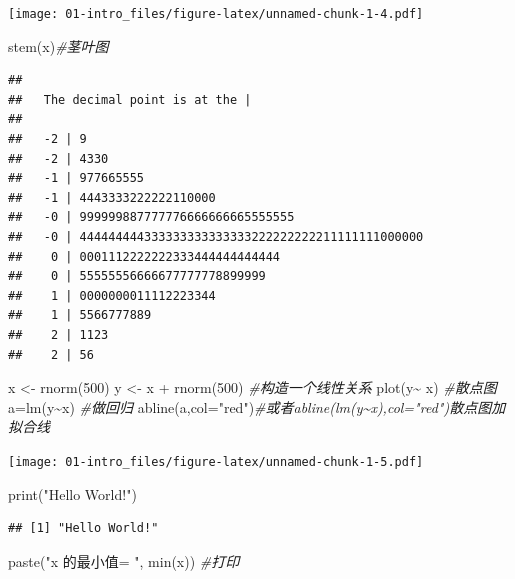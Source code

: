 \documentclass[
]{book}
\newenvironment{Shaded}{\begin{snugshade}}{\end{snugshade}}
\newcommand{\AttributeTok}[1]{\textcolor[rgb]{0.77,0.63,0.00}{#1}}
\newcommand{\CommentTok}[1]{\textcolor[rgb]{0.56,0.35,0.01}{\textit{#1}}}
\newcommand{\DecValTok}[1]{\textcolor[rgb]{0.00,0.00,0.81}{#1}}
\newcommand{\FunctionTok}[1]{\textcolor[rgb]{0.00,0.00,0.00}{#1}}
\newcommand{\NormalTok}[1]{#1}
\newcommand{\OtherTok}[1]{\textcolor[rgb]{0.56,0.35,0.01}{#1}}
\newcommand{\SpecialCharTok}[1]{\textcolor[rgb]{0.00,0.00,0.00}{#1}}
\newcommand{\StringTok}[1]{\textcolor[rgb]{0.31,0.60,0.02}{#1}}
\begin{document}
\texttt{[image: 01-intro\_files/figure-latex/unnamed-chunk-1-4.pdf]}

\begin{Shaded}
\begin{Highlighting}[]
\FunctionTok{stem}\NormalTok{(x)}\CommentTok{\#茎叶图}
\end{Highlighting}
\end{Shaded}

\begin{verbatim}
## 
##   The decimal point is at the |
## 
##   -2 | 9
##   -2 | 4330
##   -1 | 977665555
##   -1 | 4443333222222110000
##   -0 | 999999887777776666666665555555
##   -0 | 444444444333333333333333222222222211111111000000
##    0 | 0001112222222333444444444444
##    0 | 55555556666677777778899999
##    1 | 0000000011112223344
##    1 | 5566777889
##    2 | 1123
##    2 | 56
\end{verbatim}

\begin{Shaded}
\begin{Highlighting}[]
\NormalTok{x }\OtherTok{\textless{}{-}} \FunctionTok{rnorm}\NormalTok{(}\DecValTok{500}\NormalTok{)}
\NormalTok{y }\OtherTok{\textless{}{-}}\NormalTok{ x }\SpecialCharTok{+} \FunctionTok{rnorm}\NormalTok{(}\DecValTok{500}\NormalTok{) }\CommentTok{\#构造一个线性关系}
\FunctionTok{plot}\NormalTok{(y}\SpecialCharTok{\textasciitilde{}}\NormalTok{ x) }\CommentTok{\#散点图}
\NormalTok{a}\OtherTok{=}\FunctionTok{lm}\NormalTok{(y}\SpecialCharTok{\textasciitilde{}}\NormalTok{x) }\CommentTok{\#做回归}
\FunctionTok{abline}\NormalTok{(a,}\AttributeTok{col=}\StringTok{"red"}\NormalTok{)}\CommentTok{\#或者abline(lm(y\textasciitilde{}x),col="red")散点图加拟合线}
\end{Highlighting}
\end{Shaded}

\texttt{[image: 01-intro\_files/figure-latex/unnamed-chunk-1-5.pdf]}

\begin{Shaded}
\begin{Highlighting}[]
\FunctionTok{print}\NormalTok{(}\StringTok{"Hello World!"}\NormalTok{)}
\end{Highlighting}
\end{Shaded}

\begin{verbatim}
## [1] "Hello World!"
\end{verbatim}

\begin{Shaded}
\begin{Highlighting}[]
\FunctionTok{paste}\NormalTok{(}\StringTok{"x 的最小值= "}\NormalTok{, }\FunctionTok{min}\NormalTok{(x)) }\CommentTok{\#打印}
\end{Highlighting}
\end{Shaded}
\end{document}
